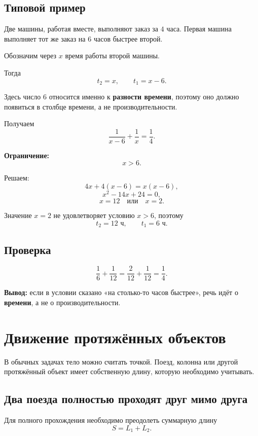 \documentclass[a4paper,12pt]{article}
\newcommand{\key}[1]{\textcolor{darkaccent}{\textbf{#1}}}
\begin{document}
\subsection*{Типовой пример}

Две машины, работая вместе, выполняют заказ за \(4\) часа.
Первая машина выполняет тот же заказ на \(6\) часов быстрее второй.

Обозначим через \(x\) время работы второй машины.

Тогда
\[
t_2=x,
\qquad
t_1=x-6.
\]

Здесь число \(6\) относится именно к \key{разности времени}, поэтому оно
должно появиться в столбце времени, а не производительности.

Получаем
\[
\frac1{x-6}+\frac1x=\frac14.
\]

\key{Ограничение:}
\[
x>6.
\]

Решаем:
\[
4x+4(x-6)=x(x-6),
\]
\[
x^2-14x+24=0,
\]
\[
x=12
\quad\text{или}\quad
x=2.
\]

Значение \(x=2\) не удовлетворяет условию \(x>6\), поэтому
\[
t_2=12\text{ ч},
\qquad
t_1=6\text{ ч}.
\]

\subsection*{Проверка}

\[
\frac16+\frac1{12}
=
\frac2{12}+\frac1{12}
=
\frac14.
\]

\key{Вывод:} если в условии сказано
«на столько-то часов быстрее», речь идёт о \textbf{времени},
а не о производительности.


\section{Движение протяжённых объектов}

В обычных задачах тело можно считать точкой.
Поезд, колонна или другой протяжённый объект имеет собственную длину,
которую необходимо учитывать.

\subsection*{Два поезда полностью проходят друг мимо друга}

Для полного прохождения необходимо преодолеть суммарную длину
\[
S=L_1+L_2.
\]
\end{document}
